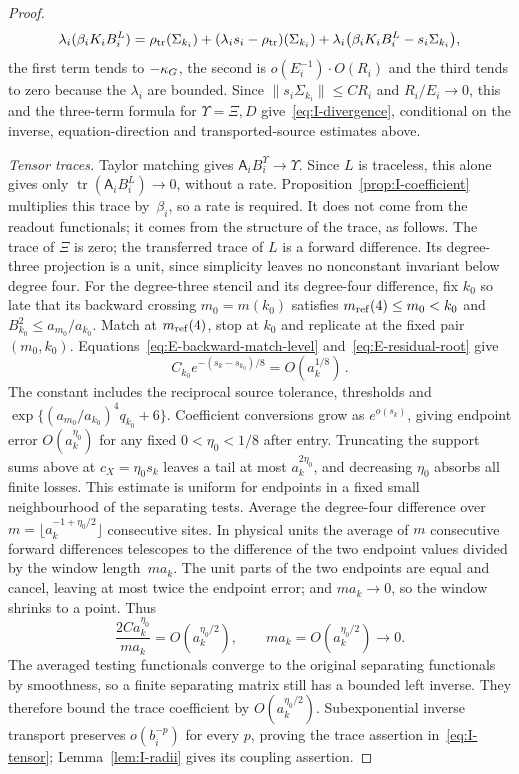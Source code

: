 \begin{proof}
\begin{equation*}
\lambda_i(\beta_iK_iB_i^L)=\rho_{\rm tr}(\Sigma_{k_i})
+(\lambda_is_i-\rho_{\rm tr})(\Sigma_{k_i})
+\lambda_i\bigl(\beta_iK_iB_i^L-s_i\Sigma_{k_i}\bigr),
\end{equation*}
the first term tends to $-\kappa_G$, the second is $o(E_i^{-1})\cdot O(R_i)$ and the third tends to zero because the $\lambda_i$ are bounded. Since $\|s_i\Sigma_{k_i}\|\le CR_i$ and $R_i/E_i\to0$, this and the three-term formula for $\Upsilon=\Xi,D$ give~\eqref{eq:I-divergence}, conditional on the inverse, equation-direction and transported-source estimates above.

\emph{Tensor traces.} Taylor matching gives $\mathsf A_iB_i^\Upsilon\to\Upsilon$. Since $L$ is traceless, this alone gives only $\operatorname{tr}(\mathsf A_iB_i^L)\to0$, without a rate. Proposition~\ref{prop:I-coefficient} multiplies this trace by~$\beta_i$, so a rate is required. It does not come from the readout functionals; it comes from the structure of the trace, as follows. The trace of $\Xi$ is zero; the transferred trace of $L$ is a forward difference. Its degree-three projection is a unit, since simplicity leaves no nonconstant invariant below degree four. For the degree-three stencil and its degree-four difference, fix $k_0$ so late that its backward crossing $m_0=m(k_0)$ satisfies $m_{\mathrm{ref}}(4)\le m_0<k_0$ and $B_{k_0}^2\le a_{m_0}/a_{k_0}$. Match at $m_{\mathrm{ref}}(4)$, stop at $k_0$ and replicate at the fixed pair $(m_0,k_0)$. Equations~\eqref{eq:E-backward-match-level} and~\eqref{eq:E-residual-root} give
\begin{equation*}
C_{k_0}e^{-(s_k-s_{k_0})/8}=O(a_k^{1/8})\,.
\end{equation*}
The constant includes the reciprocal source tolerance, thresholds and $\exp\{(a_{m_0}/a_{k_0})^4q_{k_0}+6\}$. Coefficient conversions grow as $e^{o(s_k)}$, giving endpoint error $O(a_k^{\eta_0})$ for any fixed $0<\eta_0<1/8$ after entry. Truncating the support sums above at $c_X=\eta_0s_k$ leaves a tail at most $a_k^{2\eta_0}$, and decreasing $\eta_0$ absorbs all finite losses. This estimate is uniform for endpoints in a fixed small neighbourhood of the separating tests. Average the degree-four difference over $m=\lfloor a_k^{-1+\eta_0/2}\rfloor$ consecutive sites. In physical units the average of $m$ consecutive forward differences telescopes to the difference of the two endpoint values divided by the window length~$ma_k$. The unit parts of the two endpoints are equal and cancel, leaving at most twice the endpoint error; and $ma_k\to0$, so the window shrinks to a point. Thus
\begin{equation*}
 \frac{2Ca_k^{\eta_0}}{ma_k}=O(a_k^{\eta_0/2}),
 \qquad ma_k=O(a_k^{\eta_0/2})\longrightarrow0.
\end{equation*}
The averaged testing functionals converge to the original separating functionals by smoothness, so a finite separating matrix still has a bounded left inverse. They therefore bound the trace coefficient by $O(a_k^{\eta_0/2})$. Subexponential inverse transport preserves $o(b_i^{-p})$ for every $p$, proving the trace assertion in~\eqref{eq:I-tensor}; Lemma~\ref{lem:I-radii} gives its coupling assertion.
\end{proof}

